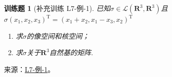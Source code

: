 \documentclass[UTF8,12pt,a4paper,fontset=fandol]{ctexart}
\newtheorem{exercise}{训练题}[section]
\begin{document}
\begin{exercise}[补充训练 L7-例-1]\label{prob:L7-例-1}
已知$\sigma \in \mathcal{L}(\mathbf{R}^3,\mathbf{R}^3)$且$\sigma(x_1,x_2,x_3)^{\mathrm{T}}=(x_1+x_2,x_1-x_3, x_2)^{\mathrm{T}}$
    \begin{enumerate}
        \item 求$\sigma$的像空间和核空间；

        \item 求$\sigma$关于$\mathbf{R}^3$自然基的矩阵.
    \end{enumerate}
\end{exercise}
\noindent 来源：\href{https://github.com/yhwu-is/Linear-Algebra-Left-Undone/blob/new/%E8%AE%B2%E4%B9%89/%E4%B8%93%E9%A2%98/7%20%E7%BA%BF%E6%80%A7%E6%98%A0%E5%B0%84%E7%9F%A9%E9%98%B5%E8%A1%A8%E7%A4%BA%E4%B8%8E%E7%9F%A9%E9%98%B5%E8%BF%90%E7%AE%97%E5%9F%BA%E7%A1%80.tex}{L7-例-1}。
\end{document}

